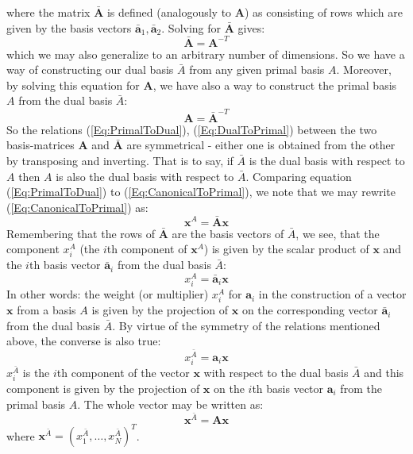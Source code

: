 where the matrix $\bar{\mathbf{A}}$ is defined (analogously to $\mathbf{A}$) as consisting of rows which are given by the basis vectors $\bar{\mathbf{a}}_1, \bar{\mathbf{a}}_2$. Solving for $\bar{\mathbf{A}}$ gives:
\begin{equation}
\label{Eq:PrimalToDual}
\boxed
{
 \bar{\mathbf{A}} = \mathbf{A}^{-T}
}
\end{equation}
which we may also generalize to an arbitrary number of dimensions. So we have a way of constructing our dual basis $\bar{A}$ from any given primal basis $A$. Moreover, by solving this equation for $\mathbf{A}$, we have also a way to construct the primal basis $A$ from the dual basis $\bar{A}$:
\begin{equation}
\label{Eq:DualToPrimal}
\boxed
{
 \mathbf{A} = \bar{\mathbf{A}}^{-T}
}
\end{equation}
So the relations (\ref{Eq:PrimalToDual}), (\ref{Eq:DualToPrimal}) between the two basis-matrices $\mathbf{A}$ and $\bar{\mathbf{A}}$ are symmetrical - either one is obtained from the other by transposing and inverting. That is to say, if $\bar{A}$ is the dual basis with respect to $A$ then $A$ is also the dual basis with respect to $\bar{A}$. Comparing equation (\ref{Eq:PrimalToDual}) to (\ref{Eq:CanonicalToPrimal}), we note that we may rewrite (\ref{Eq:CanonicalToPrimal}) as:
\begin{equation}
\label{Eq:CanonicalToPrimalViaDual}
 \mathbf{x}^A = \bar{\mathbf{A}} \mathbf{x}
\end{equation}
Remembering that the rows of $\bar{\mathbf{A}}$ are the basis vectors of $\bar{A}$, we see, that the component $x_i^A$ (the $i$th component of $\mathbf{x}^A$) is given by the scalar product of $\mathbf{x}$ and the $i$th basis vector $\bar{\mathbf{a}}_i$ from the dual basis $\bar{A}$:
\begin{equation}
 x_i^A = \bar{\mathbf{a}}_i \mathbf{x}
\end{equation}
In other words: the weight (or multiplier) $x_i^A$ for $\mathbf{a}_i$ in the construction of a vector $\mathbf{x}$ from a basis $A$ is given by the projection of $\mathbf{x}$ on the corresponding vector $\bar{\mathbf{a}}_i$ from the dual basis $\bar{A}$. By virtue of the symmetry of the relations mentioned above, the converse is also true:
\begin{equation}
 x_i^{\bar{A}} = \mathbf{a}_i \mathbf{x}
\end{equation}
$x_i^{\bar{A}}$ is the $i$th component of the vector $\mathbf{x}$ with respect to the dual basis $\bar{A}$ and this component is given by the projection of $\mathbf{x}$ on the $i$th basis vector $\mathbf{a}_i$ from the primal basis $A$. The whole vector may be written as:
\begin{equation}
\label{Eq:CanonicalToDualViaPrimal}
 \mathbf{x}^{\bar{A}} = \mathbf{A} \mathbf{x}
\end{equation}
where $\mathbf{x}^{\bar{A}} = (x_1^{\bar{A}}, \ldots, x_N^{\bar{A}})^T$.

